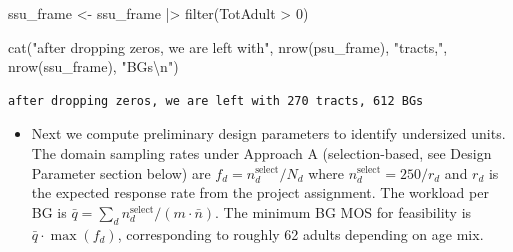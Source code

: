 \documentclass[
  11pt,
]{article}
\newenvironment{Shaded}{\begin{snugshade}}{\end{snugshade}}
\newcommand{\DecValTok}[1]{\textcolor[rgb]{0.68,0.00,0.00}{#1}}
\newcommand{\FunctionTok}[1]{\textcolor[rgb]{0.28,0.35,0.67}{#1}}
\newcommand{\NormalTok}[1]{\textcolor[rgb]{0.00,0.23,0.31}{#1}}
\newcommand{\OtherTok}[1]{\textcolor[rgb]{0.00,0.23,0.31}{#1}}
\newcommand{\SpecialCharTok}[1]{\textcolor[rgb]{0.37,0.37,0.37}{#1}}
\newcommand{\StringTok}[1]{\textcolor[rgb]{0.13,0.47,0.30}{#1}}
\providecommand{\tightlist}{%
  \setlength{\itemsep}{0pt}\setlength{\parskip}{0pt}}\usepackage{longtable,booktabs,array}
\begin{document}
\begin{Shaded}
\begin{Highlighting}[]
\NormalTok{ssu\_frame }\OtherTok{\textless{}{-}}\NormalTok{ ssu\_frame }\SpecialCharTok{|\textgreater{}} \FunctionTok{filter}\NormalTok{(TotAdult }\SpecialCharTok{\textgreater{}} \DecValTok{0}\NormalTok{)}

\FunctionTok{cat}\NormalTok{(}\StringTok{"after dropping zeros, we are left with"}\NormalTok{, }\FunctionTok{nrow}\NormalTok{(psu\_frame), }\StringTok{"tracts,"}\NormalTok{,}
    \FunctionTok{nrow}\NormalTok{(ssu\_frame), }\StringTok{"BGs}\SpecialCharTok{\textbackslash{}n}\StringTok{"}\NormalTok{)}
\end{Highlighting}
\end{Shaded}

\begin{verbatim}
after dropping zeros, we are left with 270 tracts, 612 BGs
\end{verbatim}

\hfill\break

\begin{itemize}
\tightlist
\item
  Next we compute preliminary design parameters to identify undersized
  units. The domain sampling rates under Approach A (selection-based,
  see Design Parameter section below) are
  \(f_d = n_d^{\text{select}} / N_d\) where
  \(n_d^{\text{select}} = 250 / r_d\) and \(r_d\) is the expected
  response rate from the project assignment. The workload per BG is
  \(\bar{q} = \sum_d n_d^{\text{select}} / (m \cdot \bar{n})\). The
  minimum BG MOS for feasibility is \(\bar{q} \cdot \max(f_d)\),
  corresponding to roughly 62 adults depending on age mix.
\end{itemize}
\end{document}
